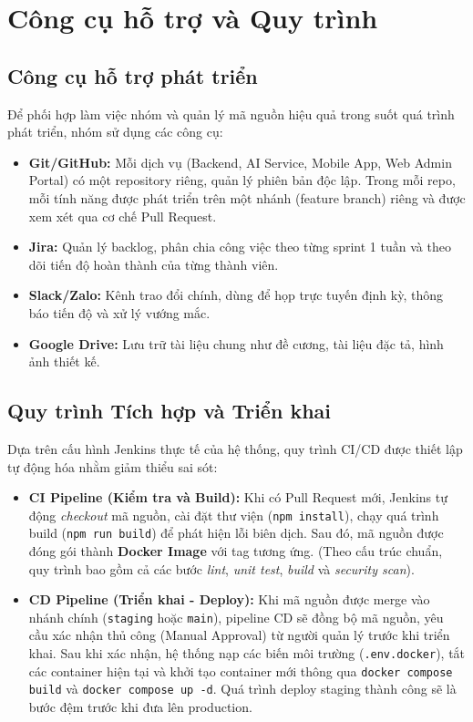 \section{Công cụ hỗ trợ và Quy trình}
\subsection{Công cụ hỗ trợ phát triển}
Để phối hợp làm việc nhóm và quản lý mã nguồn hiệu quả trong suốt quá trình phát triển, nhóm sử dụng các công cụ:
\begin{itemize}
    \item \textbf{Git/GitHub:} Mỗi dịch vụ (Backend, AI Service, Mobile App, Web Admin Portal) có một repository riêng, quản lý phiên bản độc lập. Trong mỗi repo, mỗi tính năng được phát triển trên một nhánh (feature branch) riêng và được xem xét qua cơ chế Pull Request.
    \item \textbf{Jira:} Quản lý backlog, phân chia công việc theo từng sprint 1 tuần và theo dõi tiến độ hoàn thành của từng thành viên.
    \item \textbf{Slack/Zalo:} Kênh trao đổi chính, dùng để họp trực tuyến định kỳ, thông báo tiến độ và xử lý vướng mắc.
    \item \textbf{Google Drive:} Lưu trữ tài liệu chung như đề cương, tài liệu đặc tả, hình ảnh thiết kế.
\end{itemize}

\subsection{Quy trình Tích hợp và Triển khai}
Dựa trên cấu hình Jenkins thực tế của hệ thống, quy trình CI/CD được thiết lập tự động hóa nhằm giảm thiểu sai sót:
\begin{itemize}
    \item \textbf{CI Pipeline (Kiểm tra và Build):} Khi có Pull Request mới, Jenkins tự động \textit{checkout} mã nguồn, cài đặt thư viện (\texttt{npm install}), chạy quá trình build (\texttt{npm run build}) để phát hiện lỗi biên dịch. Sau đó, mã nguồn được đóng gói thành \textbf{Docker Image} với tag tương ứng. (Theo cấu trúc chuẩn, quy trình bao gồm cả các bước \textit{lint}, \textit{unit test}, \textit{build} và \textit{security scan}).
    \item \textbf{CD Pipeline (Triển khai - Deploy):} Khi mã nguồn được merge vào nhánh chính (\texttt{staging} hoặc \texttt{main}), pipeline CD sẽ đồng bộ mã nguồn, yêu cầu xác nhận thủ công (Manual Approval) từ người quản lý trước khi triển khai. Sau khi xác nhận, hệ thống nạp các biến môi trường (\texttt{.env.docker}), tắt các container hiện tại và khởi tạo container mới thông qua \texttt{docker compose build} và \texttt{docker compose up -d}. Quá trình deploy staging thành công sẽ là bước đệm trước khi đưa lên production.
\end{itemize}

